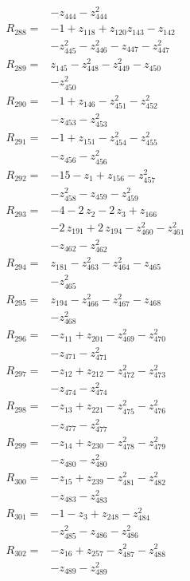 \begin{align*}
&-z_{444} -z_{444}^{2}\\[2pt]
R_{288}={}&-1 +z_{118} +z_{120}z_{143} -z_{142}\\
&-z_{445}^{2} -z_{446}^{2} -z_{447} -z_{447}^{2}\\[2pt]
R_{289}={}&z_{145} -z_{448}^{2} -z_{449}^{2} -z_{450}\\
&-z_{450}^{2}\\[2pt]
R_{290}={}&-1 +z_{146} -z_{451}^{2} -z_{452}^{2}\\
&-z_{453} -z_{453}^{2}\\[2pt]
R_{291}={}&-1 +z_{151} -z_{454}^{2} -z_{455}^{2}\\
&-z_{456} -z_{456}^{2}\\[2pt]
R_{292}={}&-15 -z_{1} +z_{156} -z_{457}^{2}\\
&-z_{458}^{2} -z_{459} -z_{459}^{2}\\[2pt]
R_{293}={}&-4 -2\,z_{2} -2\,z_{3} +z_{166}\\
&-2\,z_{191} +2\,z_{194} -z_{460}^{2} -z_{461}^{2}\\
&-z_{462} -z_{462}^{2}\\[2pt]
R_{294}={}&z_{181} -z_{463}^{2} -z_{464}^{2} -z_{465}\\
&-z_{465}^{2}\\[2pt]
R_{295}={}&z_{194} -z_{466}^{2} -z_{467}^{2} -z_{468}\\
&-z_{468}^{2}\\[2pt]
R_{296}={}&-z_{11} +z_{201} -z_{469}^{2} -z_{470}^{2}\\
&-z_{471} -z_{471}^{2}\\[2pt]
R_{297}={}&-z_{12} +z_{212} -z_{472}^{2} -z_{473}^{2}\\
&-z_{474} -z_{474}^{2}\\[2pt]
R_{298}={}&-z_{13} +z_{221} -z_{475}^{2} -z_{476}^{2}\\
&-z_{477} -z_{477}^{2}\\[2pt]
R_{299}={}&-z_{14} +z_{230} -z_{478}^{2} -z_{479}^{2}\\
&-z_{480} -z_{480}^{2}\\[2pt]
R_{300}={}&-z_{15} +z_{239} -z_{481}^{2} -z_{482}^{2}\\
&-z_{483} -z_{483}^{2}\\[2pt]
R_{301}={}&-1 -z_{3} +z_{248} -z_{484}^{2}\\
&-z_{485}^{2} -z_{486} -z_{486}^{2}\\[2pt]
R_{302}={}&-z_{16} +z_{257} -z_{487}^{2} -z_{488}^{2}\\
&-z_{489} -z_{489}^{2}\\[2pt]

\end{align*}
